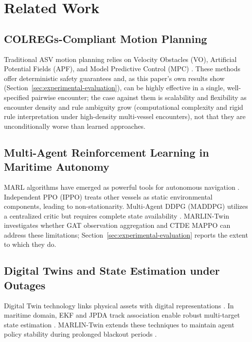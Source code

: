 \documentclass[journal,twocolumn,10pt]{IEEEtran}
\begin{document}
\section{Related Work}
\subsection{COLREGs-Compliant Motion Planning}
Traditional ASV motion planning relies on Velocity Obstacles (VO), Artificial Potential Fields (APF), and Model Predictive Control (MPC) \cite{wang2025realtime_colregs, xu2024colregs}. These methods offer deterministic safety guarantees and, as this paper's own results show (Section~\ref{sec:experimental-evaluation}), can be highly effective in a single, well-specified pairwise encounter; the case against them is scalability and flexibility as encounter density and rule ambiguity grow (computational complexity and rigid rule interpretation under high-density multi-vessel encounters), not that they are unconditionally worse than learned approaches.

\subsection{Multi-Agent Reinforcement Learning in Maritime Autonomy}
MARL algorithms have emerged as powerful tools for autonomous navigation \cite{zheng2025marl, yu2023mappo}. Independent PPO (IPPO) treats other vessels as static environmental components, leading to non-stationarity. Multi-Agent DDPG (MADDPG) utilizes a centralized critic but requires complete state availability \cite{lowe2017multi}. MARLIN-Twin investigates whether GAT observation aggregation and CTDE MAPPO \cite{velickovic2018graph, park2025gat} can address these limitations; Section~\ref{sec:experimental-evaluation} reports the extent to which they do.

\subsection{Digital Twins and State Estimation under Outages}
Digital Twin technology links physical assets with digital representations \cite{chen2024digitaltwin, chen2025digital_twin_fleet, zhang2025digital_twin_asv}. In maritime domain, EKF and JPDA track association enable robust multi-target state estimation \cite{zhang2023ekf}. MARLIN-Twin extends these techniques to maintain agent policy stability during prolonged blackout periods \cite{wu2024ais_outage, huang2025ais, zhou2024ais_denoising}.
\end{document}
